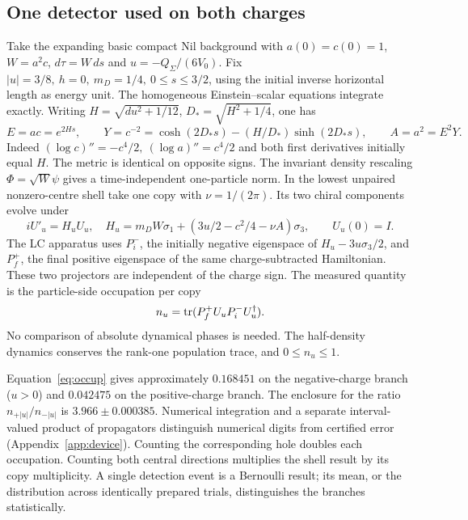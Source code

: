 \subsection{One detector used on both charges}
Take the expanding basic compact Nil background with \(a(0)=c(0)=1\), \(W=a^2c\), \(d\tau=W\,ds\) and \(u=-Q_\Sigma/(6V_0)\). Fix \(|u|=3/8,\ h=0,\ m_D=1/4,\ 0\le s\le3/2\), using the initial inverse horizontal length as energy unit. The homogeneous Einstein--scalar equations integrate exactly. Writing \(H=\sqrt{du^2+1/12}\), \(D_*=\sqrt{H^2+1/4}\), one has
\begin{equation}
 E=ac=e^{2Hs},\qquad Y=c^{-2}=\cosh(2D_*s)-(H/D_*)\sinh(2D_*s),\qquad A=a^2=E^2Y .
 \label{eq:nilhistory}
\end{equation}
Indeed \((\log c)''=-c^4/2,\ (\log a)''=c^4/2\) and both first derivatives initially equal \(H\). The metric is identical on opposite signs. The invariant density rescaling \(\Phi=\sqrt W\psi\) gives a time-independent one-particle norm. In the lowest unpaired nonzero-centre shell take one copy with \(\nu=1/(2\pi)\). Its two chiral components evolve under
\begin{equation}
 i U'_u=H_u U_u,\quad H_u=m_D W\sigma_1+(3u/2-c^2/4-\nu A)\sigma_3,\qquad U_u(0)=I.
 \label{eq:device}
\end{equation}
The LC apparatus uses \(P_i^-\), the initially negative eigenspace of \(H_u-3u\sigma_3/2\), and \(P_f^+\), the final positive eigenspace of the same charge-subtracted Hamiltonian. These two projectors are independent of the charge sign. The measured quantity is the particle-side occupation per copy
\begin{equation}
 n_u=\operatorname{tr}(P_f^+ U_u P_i^- U_u^\dagger).
 \label{eq:occup}
\end{equation}
No comparison of absolute dynamical phases is needed. The half-density dynamics conserves the rank-one population trace, and \(0\le n_u\le1\).

Equation~\eqref{eq:occup} gives approximately \(0.168451\) on the negative-charge branch (\(u>0\)) and \(0.042475\) on the positive-charge branch. The enclosure for the ratio \(n_{+|u|}/n_{-|u|}\) is \(3.966\pm0.000385\). Numerical integration and a separate interval-valued product of propagators distinguish numerical digits from certified error (Appendix~\ref{app:device}). Counting the corresponding hole doubles each occupation. Counting both central directions multiplies the shell result by its copy multiplicity. A single detection event is a Bernoulli result; its mean, or the distribution across identically prepared trials, distinguishes the branches statistically.


